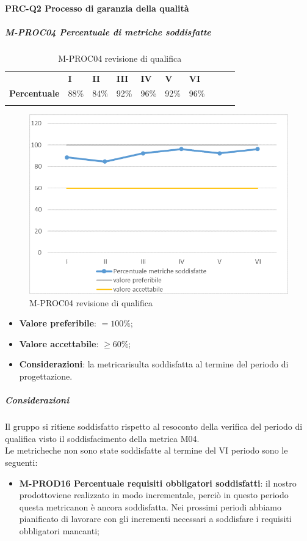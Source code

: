 \paragraph*{PRC-Q2 Processo di garanzia della qualità}
\subparagraph{M-PROC04 Percentuale di metriche soddisfatte} \mbox{}
\begin{longtable}[H!] {						
		>{}p{50mm}  		
		>{}p{8mm}
		>{}p{8mm}		
		>{}p{8mm}		
		>{}p{8mm}		
		>{}p{8mm}		
		>{}p{8mm}
		>{}p{8mm}
		>{}p{8mm}
		>{}p{8mm}
	}
	\rowcolor{gray!50}
	\textbf{} & \textbf{I} & \textbf{II} & \textbf{III} & \textbf{IV} & \textbf{V} & \textbf{VI}\TBstrut \\ [2mm]
	\textbf{Percentuale} & 88\% & 84\% & 92\% & 96\% & 92\% & 96\% \TBstrut \\ [2mm]
	\rowcolor{white}
	\caption{M-PROC04 revisione di qualifica}
\end{longtable}
\begin{figure}[H] 	
	\includegraphics[width=\linewidth]{./img/grafici/RQ4.png}	
	\caption{M-PROC04 revisione di qualifica}	
\end{figure}
\begin{itemize}
	\item \textbf{Valore preferibile}: $=100\%$;
	\item \textbf{Valore accettabile}: $\ge60\%$;
	\item \textbf{Considerazioni}: la metrica\glosp risulta soddisfatta al termine del periodo di progettazione\glo.
\end{itemize}
\subparagraph{Considerazioni}
Il gruppo si ritiene soddisfatto rispetto al resoconto della verifica del periodo di qualifica visto il soddisfacimento della metrica M04. \\
Le metriche\glosp che non sono state soddisfatte al termine del VI periodo sono le seguenti:
\begin{itemize}
	\item \textbf{M-PROD16 Percentuale requisiti obbligatori soddisfatti}: il nostro prodotto\glo viene realizzato in modo incrementale, perciò in questo periodo questa metrica\glosp non è ancora soddisfatta. Nei prossimi periodi abbiamo pianificato di lavorare con gli incrementi necessari a soddisfare i requisiti obbligatori mancanti;
\end{itemize}  


